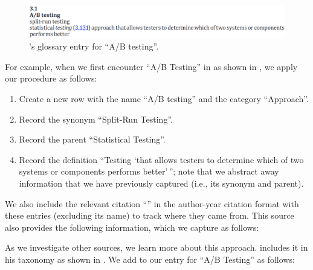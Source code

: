 \begin{figure}[bt!]
    \includegraphics[width=\linewidth]{assets/images/a-b testing.png}
    \caption{ \citet[p.~1]{IEEE2022}'s glossary entry for
        ``A/B testing''.}\label{fig:IEEE-A-B-Testing}
\end{figure}

For example, when we first encounter ``A/B Testing'' in
\citet[p.~1, 36]{IEEE2022} as shown in , we apply
our procedure as follows:
\begin{enumerate}
    \item Create a new row with the name ``A/B testing'' and the category
          ``Approach''.
    \item Record the synonym ``Split-Run Testing''.
    \item Record the parent ``Statistical Testing''.
    \item Record the definition ``Testing `that allows testers to determine
          which of two systems or components performs better'\,''; note that
          we abstract away information that we have previously captured (i.e.,
          its synonym and parent).
\end{enumerate}
\ifnotpaper\newpage\noindent\fi
We also include the relevant citation \ifnotpaper ``\citep[pp.~1, 36]{IEEE2022}''
\else in the author-year citation format \fi with these entries (excluding its
name) to track where they came from. This source also provides the following
information, which we capture as follows:
As we investigate other sources, we learn more about this approach. \ifnotpaper
\else \citeauthor{Firesmith2015} \fi \citet[p.~58]{Firesmith2015} includes it
in his taxonomy as shown in . We add to our
entry for ``A/B Testing'' as follows:

